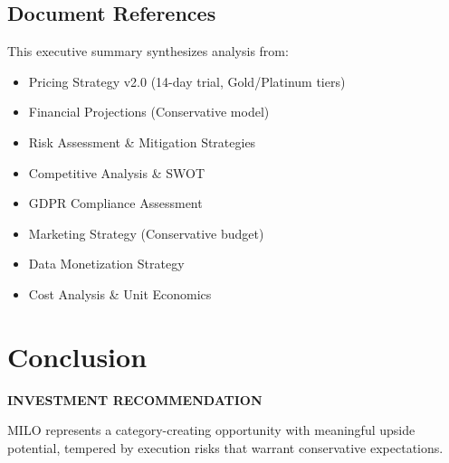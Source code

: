 \documentclass[11pt,a4paper]{article}
\begin{document}
\subsection{Document References}

This executive summary synthesizes analysis from:

\begin{itemize}[leftmargin=20pt, itemsep=3pt]
    \item Pricing Strategy v2.0 (14-day trial, Gold/Platinum tiers)
    \item Financial Projections (Conservative model)
    \item Risk Assessment \& Mitigation Strategies
    \item Competitive Analysis \& SWOT
    \item GDPR Compliance Assessment
    \item Marketing Strategy (Conservative budget)
    \item Data Monetization Strategy
    \item Cost Analysis \& Unit Economics
\end{itemize}

\newpage

\section*{Conclusion}

\begin{keymetricbox}
\begin{center}
{\Large\bfseries INVESTMENT RECOMMENDATION}\\[20pt]


\vspace{15pt}

{\large MILO represents a category-creating opportunity with meaningful upside potential, tempered by execution risks that warrant conservative expectations.}
\end{center}
\end{keymetricbox}
\end{document}
